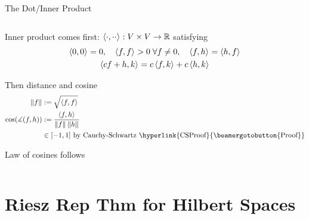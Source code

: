 \documentclass[10pt,compress,xcolor={usenames,dvipsnames},aspectratio=169]{beamer}
\begin{document}
\begin{frame}[label = dotproduct]{The Dot/Inner Product}
\begin{columns}
\begin{column}{0.5\textwidth}
{ \medskip
 
Inner product comes first:  $\left \langle \cdot, \cdot \cdot \right \rangle_{{}} :  V \times V \to \mathbb{R}$ satisfying
 \vspace{-1.5ex}
 \begin{gather*}
 \left \langle 0, 0 \right \rangle_{{}} =0, \quad \left \langle f, f \right \rangle_{{}} > 0 \; \forall f \ne 0, \quad
 \left \langle f, h \right \rangle_{{}} =\left \langle h, f \right \rangle_{{}} \\
  \left \langle cf+h, k \right \rangle_{{}} = c \left \langle f, k \right \rangle_{{}} + c\left \langle h, k \right \rangle_{{}} 
 \end{gather*}

\vspace{-1.5ex}
Then distance and cosine
\vspace{-1.5ex}
 \begin{align*}
 	\norm{f} & := \sqrt{\ip{f}{f}}
 	\\
 	\cos(\measuredangle(f,h)) & : = \frac{\ip{f}{h}}{\norm{f}\norm{h}}  \\
 	& \in [-1,1] \text{ by Cauchy-Schwartz \hyperlink{CSProof}{\beamergotobutton{Proof}}}
  \end{align*}
 
 \vspace{-1.5ex}
 Law of cosines follows 

}
\end{column}
\end{columns}

\end{frame}


\section{Riesz Rep Thm for Hilbert Spaces}
\end{document}
